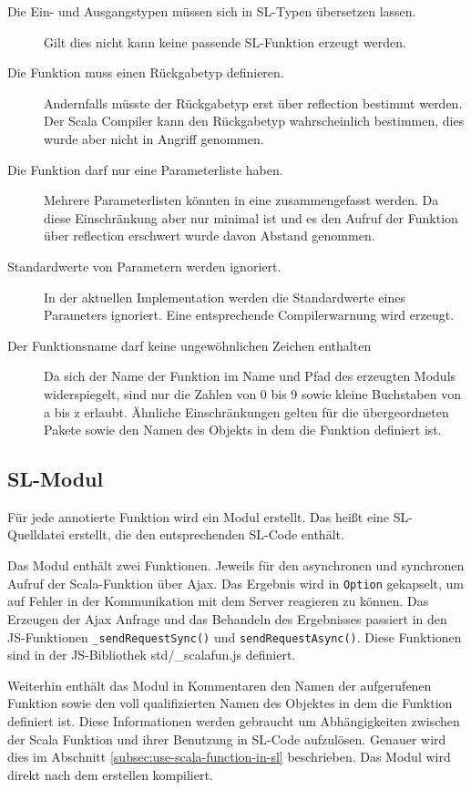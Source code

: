 \documentclass[12pt,bibtotoc]{scrreprt}
\begin{document}
\begin{description}
 \item[Die Ein- und Ausgangstypen müssen sich in SL-Typen übersetzen lassen.]{Gilt dies nicht kann keine passende SL-Funktion erzeugt werden.}
 \item[Die Funktion muss einen Rückgabetyp definieren.]{Andernfalls müsste der Rückgabetyp erst über reflection bestimmt werden. Der Scala Compiler kann den Rückgabetyp wahrscheinlich bestimmen, dies wurde aber nicht in Angriff genommen.}
 \item[Die Funktion darf nur eine Parameterliste haben.]{Mehrere Parameterlisten könnten in eine zusammengefasst werden. Da diese Einschränkung aber nur minimal ist und es den Aufruf der Funktion über reflection erschwert wurde davon Abstand genommen.}
 \item[Standardwerte von Parametern werden ignoriert.]{In der aktuellen Implementation werden die Standardwerte eines Parameters ignoriert. Eine entsprechende Compilerwarnung wird erzeugt.}
 \item[Der Funktionsname darf keine ungewöhnlichen Zeichen enthalten]{Da sich der Name der Funktion im Name und Pfad des erzeugten Moduls widerspiegelt, sind nur die Zahlen von 0 bis 9 sowie kleine Buchstaben von a bis z erlaubt. Ähnliche Einschränkungen gelten für die übergeordneten Pakete sowie den Namen des Objekts in dem die Funktion definiert ist.}
\end{description}

\subsection{SL-Modul}
\label{subsec:sl-modul}

Für jede annotierte Funktion wird ein Modul erstellt. Das heißt eine SL-Quelldatei erstellt, die den entsprechenden SL-Code enthält.

Das Modul enthält zwei Funktionen. Jeweils für den asynchronen und synchronen Aufruf der Scala-Funktion über Ajax. Das Ergebnis wird in \lstinline!Option! gekapselt, um auf Fehler in der Kommunikation mit dem Server reagieren zu können. Das Erzeugen der Ajax Anfrage und das Behandeln des Ergebnisses passiert in den \ac{JS}-Funktionen \lstinline!_sendRequestSync()! und \lstinline!sendRequestAsync()!. Diese Funktionen sind in der \ac{JS}-Bibliothek std/\_scalafun.js definiert. 

Weiterhin enthält das Modul in Kommentaren den Namen der aufgerufenen Funktion sowie den voll qualifizierten Namen des Objektes in dem die Funktion definiert ist. Diese Informationen werden gebraucht um Abhängigkeiten zwischen der Scala Funktion und ihrer Benutzung in \ac{SL}-Code aufzulösen. Genauer wird dies im Abschnitt \ref{subsec:use-scala-function-in-sl} beschrieben. Das Modul wird direkt nach dem erstellen kompiliert.
\end{document}
